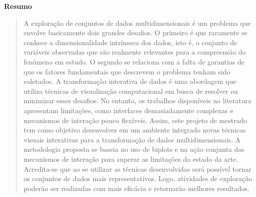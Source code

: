 \begin{center}
  \textbf{Resumo}
\end{center}

\begin{quotation}
\noindent
%
A exploração de conjuntos de dados multidimensionais é um
problema que envolve basicamente dois grandes desafios. O
primeiro é que raramente se conhece a dimensionalidade
intrínseca dos dados, isto é, o conjunto de variáveis
observadas que são realmente relevantes para a compreensão
do fenômeno em estudo. O segundo se relaciona com a falta de
garantias de que os fatores fundamentais que descrevem o
problema tenham sido coletados.
%
A transformação interativa de dados é uma abordagem que
utiliza técnicas de visualização computacional em busca de
resolver ou minimizar esses desafios. No entanto, os
trabalhos disponíveis na literatura apresentam limitações,
como interfaces demasiadamente complexas e mecanismos de
interação pouco flexíveis. 
%
Assim, este projeto de mestrado tem como objetivo
desenvolver em um ambiente integrado novas técnicas visuais
interativas para a transformação de dados multidimensionais.
A metodologia proposta se baseia no uso de biplots e na
ação conjunta dos mecanismos de interação para superar as
limitações do estado da arte.
%
Acredita-se que ao se utilizar as técnicas desenvolvidas
será possível tornar os conjuntos de dados mais
representativos. Logo, atividades de exploração poderão ser
realizadas com mais eficácia e retornarão melhores
resultados.
\end{quotation}

\clearpage
